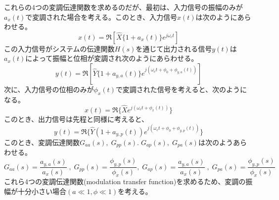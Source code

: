 \documentclass[book]{jlreq}
\begin{document}
これらの4つの変調伝達関数を求めるのだが、最初は、入力信号の振幅のみが$a_x(t)$で変調された場合を考える。このとき、入力信号$x(t)$は次のようにあらわせる。
%
\begin{equation}
    x(t) = \Re[\hat{X}\{1 + a_x(t)\}e^{j\omega_c t}]
    \label{eq:in_am_sig1}
\end{equation}
%
この入力信号がシステムの伝達関数$H(s)$を通じて出力される信号$y(t)$は$a_x(t)$によって振幅と位相が変調され次のようにあらわせる。
%
\begin{equation}
    y(t) = \Re[\hat{Y}\{1 + a_{y,a}(t)\}e^{j(\omega_c t + \phi_0 + \phi_{y,a} (t))}]
    \label{eq:out_am_sig1}
\end{equation}
%
次に、入力信号の位相のみが$\phi_x(t)$で変調された信号を考えると、次のようになる。
%
\begin{equation}
    x(t) = \Re\{\hat{X} e^{j(\omega_ct + \phi_x(t))}\}
    \label{eq:in_pm_sig1}
\end{equation}
%
このとき、出力信号は先程と同様に考えると、
%
\begin{equation}
    y(t) = \Re\{\hat{Y}(1+a_{y, p}(t))e^{j(\omega_c t + \phi_0 + \phi_{y, p}(t))}\}
    \label{eq:out_pm_sig1}
\end{equation}
%
このとき、変調伝達関数$G_{aa}(s),\;G_{pp}(s).\;G_{ap}(s),\;G_{pa}(s)$は次のようあらわせる。
%
\begin{equation}
    G_{aa}(s) =  \frac{a_{y, a}(s)}{a_x(s)}\; , \; G_{pp}(s) = \frac{\phi_{y, p}(s)}{\phi_x(s)}, \;
    G_{ap}(s) =  \frac{a_{y, a}(s)}{a_x(s)}\; , \; G_{pa}(s) = \frac{\phi_{y, p}(s)}{\phi_x(s)}
 \label{eq:md_tf}
\end{equation}
%
これら4つの変調伝達関数(modulation transfer function)を求めるため、変調の振幅が十分小さい場合$(a \ll 1, \phi \ll 1)$を考える。
\end{document}
